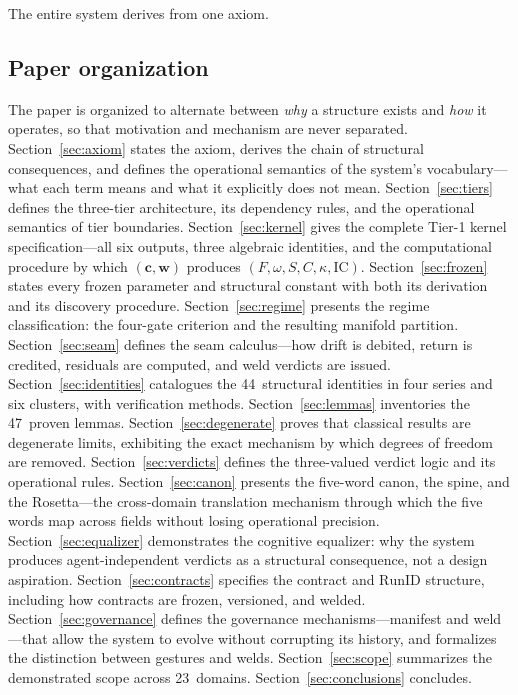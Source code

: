 \documentclass[
  aps,
  prd,
  twocolumn,
  superscriptaddress,
  nofootinbib,
  floatfix
]{revtex4-2}
\newcommand{\tvec}{\mathbf{c}}
\newcommand{\wvec}{\mathbf{w}}
\newcommand{\IC}{\mathrm{IC}}
\newcommand{\RunID}{\mathrm{RunID}}
\begin{document}
The entire system derives from one axiom.

\subsection{Paper organization}

The paper is organized to alternate between \emph{why} a structure
exists and \emph{how} it operates, so that motivation and
mechanism are never separated.
Section~\ref{sec:axiom} states the axiom, derives the chain
of structural consequences, and defines the operational
semantics of the system's vocabulary---what each term means
and what it explicitly does not mean.
Section~\ref{sec:tiers} defines the three-tier architecture,
its dependency rules, and the operational semantics of tier
boundaries.
Section~\ref{sec:kernel} gives the complete Tier-1 kernel
specification---all six outputs, three algebraic identities,
and the computational procedure by which $(\tvec, \wvec)$
produces $(F, \omega, S, C, \kappa, \IC)$.
Section~\ref{sec:frozen} states every frozen parameter and
structural constant with both its derivation and its discovery
procedure.
Section~\ref{sec:regime} presents the regime classification:
the four-gate criterion and the resulting manifold partition.
Section~\ref{sec:seam} defines the seam calculus---how drift
is debited, return is credited, residuals are computed, and
weld verdicts are issued.
Section~\ref{sec:identities} catalogues the 44~structural
identities in four series and six clusters, with verification
methods.
Section~\ref{sec:lemmas} inventories the 47~proven lemmas.
Section~\ref{sec:degenerate} proves that classical results
are degenerate limits, exhibiting the exact mechanism by
which degrees of freedom are removed.
Section~\ref{sec:verdicts} defines the three-valued verdict
logic and its operational rules.
Section~\ref{sec:canon} presents the five-word canon, the
spine, and the Rosetta---the cross-domain translation mechanism
through which the five words map across fields without losing
operational precision.
Section~\ref{sec:equalizer} demonstrates the cognitive
equalizer: why the system produces agent-independent verdicts
as a structural consequence, not a design aspiration.
Section~\ref{sec:contracts} specifies the contract and $\RunID$
structure, including how contracts are frozen, versioned, and
welded.
Section~\ref{sec:governance} defines the governance
mechanisms---manifest and weld---that allow the system to evolve
without corrupting its history, and formalizes the distinction
between gestures and welds.
Section~\ref{sec:scope} summarizes the demonstrated scope
across 23~domains.
Section~\ref{sec:conclusions} concludes.
\end{document}
